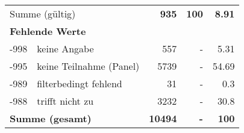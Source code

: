 \begin{longtable}{lXrrr}
     \midrule
     \multicolumn{2}{l}{Summe (gültig)} &
       \textbf{\num{935}} &
     \textbf{100} &
       \textbf{\num[round-mode=places,round-precision=2]{8,91}} \\
     \multicolumn{5}{l}{\textbf{Fehlende Werte}}\\
       -998 &
       keine Angabe &
         \num{557} &
        - &
         \num[round-mode=places,round-precision=2]{5,31} \\
       -995 &
       keine Teilnahme (Panel) &
         \num{5739} &
        - &
         \num[round-mode=places,round-precision=2]{54,69} \\
       -989 &
       filterbedingt fehlend &
         \num{31} &
        - &
         \num[round-mode=places,round-precision=2]{0,3} \\
       -988 &
       trifft nicht zu &
         \num{3232} &
        - &
         \num[round-mode=places,round-precision=2]{30,8} \\
     \midrule
     \multicolumn{2}{l}{\textbf{Summe (gesamt)}} &
          \textbf{\num{10494}} &
        \textbf{-} &
        \textbf{100} \\
     \bottomrule
     \end{longtable}
     
